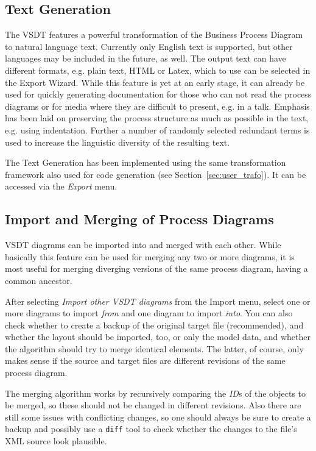 
\subsection{Text Generation}
\label{sec:user_features_text}
 
The VSDT features a powerful transformation of the Business Process Diagram to
natural language text.  Currently only English text is supported, but other
languages may be included in the future, as well.  The output text can have
different formats, e.g. plain text, HTML or Latex, which to use can be selected
in the Export Wizard.  While this feature is yet at an early stage, it can already
be used for quickly generating documentation for those who can not read the
process diagrams or for media where they are difficult to present, e.g. in a talk.
Emphasis has been laid on preserving the process structure as much as possible in
the text, e.g. using indentation.  Further a number of randomly selected redundant
terms is used to increase the linguistic diversity of the resulting text.

The Text Generation has been implemented using the same transformation framework
also used for code generation (see Section~\ref{sec:user_trafo}).  It can be
accessed via the \emph{Export} menu.



\subsection{Import and Merging of Process Diagrams}

VSDT diagrams can be imported into and merged with each other.  While basically
this feature can be used for merging any two or more diagrams, it is most useful
for merging diverging versions of the same process diagram, having a common
ancestor.

After selecting \emph{Import other VSDT diagrams} from the Import menu, select
one or more diagrams to import \emph{from} and one diagram to import \emph{into}.
You can also check whether to create a backup of the original target file
(recommended), and whether the layout should be imported, too, or only the model
data, and whether the algorithm should try to merge identical elements.  The
latter, of course, only makes sense if the source and target files are different
revisions of the same process diagram.

The merging algorithm works by recursively comparing the \emph{ID}s of the objects
to be merged, so these should not be changed in different revisions.  Also there
are still some issues with conflicting changes, so one should always be sure to
create a backup and possibly use a \texttt{diff} tool to check whether the changes
to the file's XML source look plausible.


